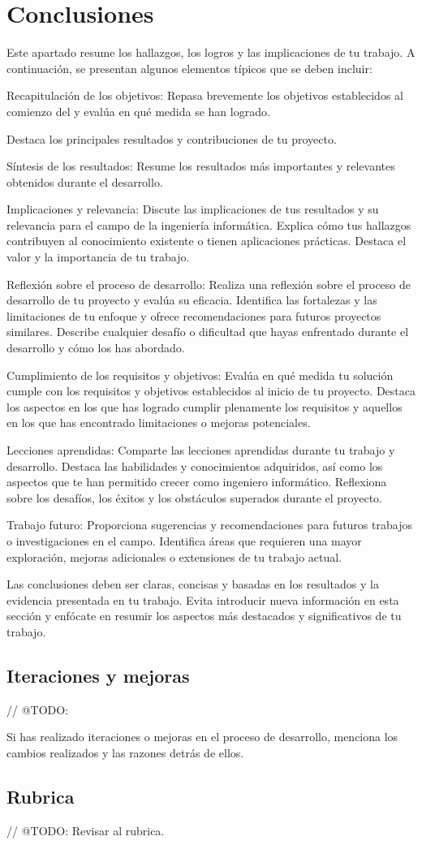 \chapter{Conclusiones}\label{ch:chapter_5}


Este apartado resume los hallazgos, los logros y las implicaciones de tu trabajo.
A continuación, se presentan algunos elementos típicos que se deben incluir:

Recapitulación de los objetivos: Repasa brevemente los objetivos establecidos al comienzo del y evalúa en qué medida se
han logrado.

Destaca los principales resultados y contribuciones de tu proyecto.

Síntesis de los resultados: Resume los resultados más importantes y relevantes obtenidos durante el desarrollo.

Implicaciones y relevancia: Discute las implicaciones de tus resultados y su relevancia para el campo
de la ingeniería informática.
Explica cómo tus hallazgos contribuyen al conocimiento existente o tienen aplicaciones prácticas.
Destaca el valor y la importancia de tu trabajo.

Reflexión sobre el proceso de desarrollo: Realiza una reflexión sobre el proceso de desarrollo de tu proyecto y evalúa
su eficacia.
Identifica las fortalezas y las limitaciones de tu enfoque y ofrece recomendaciones para futuros proyectos similares.
Describe cualquier desafío o dificultad que hayas enfrentado durante el desarrollo y cómo los has abordado.

Cumplimiento de los requisitos y objetivos: Evalúa en qué medida tu solución cumple con los requisitos y objetivos
establecidos al inicio de tu proyecto.
Destaca los aspectos en los que has logrado cumplir plenamente los requisitos y aquellos en los que has encontrado
limitaciones o mejoras potenciales.

Lecciones aprendidas: Comparte las lecciones aprendidas durante tu trabajo y desarrollo.
Destaca las habilidades y conocimientos adquiridos, así como los aspectos que te han permitido crecer como ingeniero
informático.
Reflexiona sobre los desafíos, los éxitos y los obstáculos superados durante el proyecto.

Trabajo futuro: Proporciona sugerencias y recomendaciones para futuros trabajos o investigaciones en el campo.
Identifica áreas que requieren una mayor exploración, mejoras adicionales o extensiones de tu trabajo actual.

Las conclusiones deben ser claras, concisas y basadas en los resultados y la evidencia presentada en tu trabajo.
Evita introducir nueva información en esta sección y enfócate en
resumir los aspectos más destacados y significativos de tu trabajo.


\section{Iteraciones y mejoras}
// @TODO:

Si has realizado iteraciones o mejoras en el proceso de desarrollo, menciona los cambios realizados y las razones detrás
de ellos.


\section{Rubrica}
// @TODO: Revisar al rubrica.

